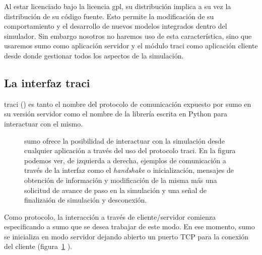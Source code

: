 Al estar licenciado bajo la licencia \gls{gpl}, su distribución implica a su vez la distribución de su código fuente. Esto permite la modificación de su comportamiento y el desarrollo de nuevos modelos integrados dentro del simulador. Sin embargo nosotros no haremos uso de esta característica, sino que usaremos \gls{sumo} como aplicación servidor y el módulo \gls{traci} como aplicación cliente desde donde gestionar todos los aspectos de la simulación.

\subsection{La interfaz \gls{traci}}

\gls{traci} (\cite{Wegener2008}) es tanto el nombre del protocolo de comunicación expuesto por \gls{sumo} en su versión servidor como el nombre de la librería escrita en Python para interactuar con el mismo.

\begin{figure}
	\centering
	\caption{\gls{sumo} ofrece la posibilidad de interactuar con la simulación desde cualquier aplicación a través del uso del protocolo \gls{traci}. En la figura podemos ver, de izquierda a derecha, ejemplos de comunicación a través de la interfaz como el \textit{handshake} o inicialización, mensajes de obtención de información y modificación de la misma más una solicitud de avance de paso en la simulación y una señal de finalizaión de simulación y desconexión.}
	\label{fig:traci-messages}
\end{figure}

Como protocolo, la interacción a través de cliente/servidor comienza especificando a \gls{sumo} que se desea trabajar de este modo. En ese momento, \gls{sumo} se inicializa en modo servidor dejando abierto un puerto TCP para la conexión del cliente (figura~\ref{fig:traci-messages} ).


